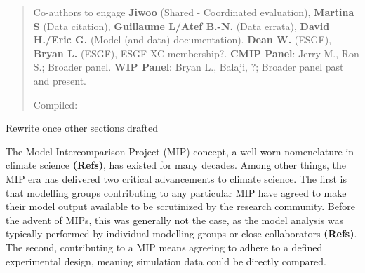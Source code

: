 \documentclass[gmd, preprint]{copernicus}
\def\cred#1{{\color{red}#1}}
\begin{document}
\begin{abstract}

\cred{Co-authors to engage}
\textbf{Jiwoo} (Shared - Coordinated evaluation), \textbf{Martina S} (Data citation), \textbf{Guillaume L/Atef B.-N.} (Data errata), \textbf{David H./Eric G.} (Model (and data) documentation).
\textbf{Dean W.} (ESGF), \textbf{Bryan L.} (ESGF), ESGF-XC membership?.
\textbf{CMIP Panel}: Jerry M., Ron S.; Broader panel.
\textbf{WIP Panel}: Bryan L., Balaji, ?; Broader panel past and present.

{Compiled: \DTMnow}

\end{abstract}



\introduction  %
\cred{Rewrite once other sections drafted}

The Model Intercomparison Project (MIP) concept, a well-worn nomenclature in climate science \cred{\textbf{(Refs)}}, has existed for many decades. Among other things, the MIP era has delivered two critical advancements to climate science. The first is that modelling groups contributing to any particular MIP have agreed to make their model output available to be scrutinized by the research community. Before the advent of MIPs, this was generally not the case, as the model analysis was typically performed by individual modelling groups or close collaborators \cred{\textbf{(Refs)}}. The second, contributing to a MIP means agreeing to adhere to a defined experimental design, meaning simulation data could be directly compared.
\end{document}
